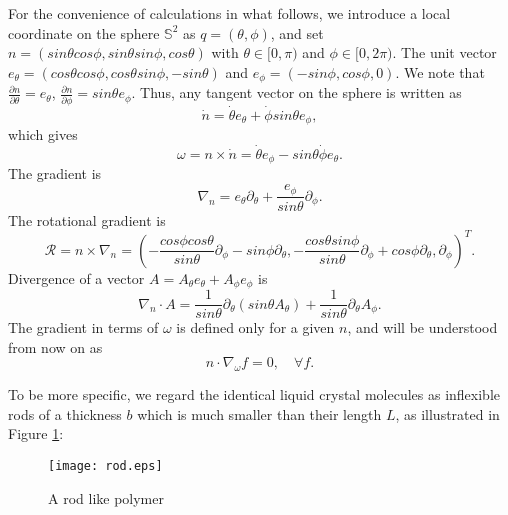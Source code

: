 \documentclass[reqno]{amsart}
\numberwithin{equation}{section}
\theoremstyle{definition}
\theoremstyle{remark}
\begin{document}
For the convenience of calculations in what follows, we introduce a
local coordinate on the sphere $\mathbb{S}^2$ as $q=(\theta, \phi)$,
and set $n=(sin \theta cos \phi, sin \theta sin \phi, cos \theta)$
with $\theta \in [0, \pi)$ and $\phi\in [0, 2\pi)$. The unit vector
$e_\theta=(cos \theta cos \phi, cos \theta sin \phi, -sin \theta)$
and $e_\phi=(-sin \phi, cos \phi, 0)$. We note that $\frac{\partial
n}{\partial \theta}=e_\theta$, $\frac{\partial n}{\partial \phi}=sin
\theta e_\phi$. Thus, any tangent vector on the sphere is written as
$$
\dot n =\dot \theta e_\theta +\dot \phi sin \theta e_\phi,
$$
which gives
$$
\omega=n\times \dot n= \dot \theta e_\phi - sin \theta \dot \phi
e_\theta.
$$
 The gradient is
$$
\nabla_n=e_\theta \partial_\theta +\frac{e_\phi}{sin
\theta}\partial_\phi.
$$
The rotational gradient is
\begin{equation}\label{go}
\mathcal{R}= n\times \nabla_n=\left(-\frac{cos \phi cos \theta}{sin
\theta} \partial_\phi -sin \phi \partial_\theta, -\frac{cos \theta
sin \phi}{sin \theta} \partial_\phi +cos\phi \partial_\theta,
\partial_\phi \right)^T.
\end{equation}
Divergence of a vector $A= A_\theta e_\theta +  A_\phi  e_\phi$ is
$$
\nabla_n\cdot A=\frac{1}{sin \theta} \partial_\theta(sin \theta
A_\theta) +\frac{1}{sin \theta}\partial_\theta A_\phi.
$$
The gradient in terms of $\omega$ is defined only for a given $n$,
and will be understood from now on as
$$
 n\cdot \nabla_\omega f=0, \quad \forall f.
$$

To be more specific, we regard the identical liquid crystal
molecules as inflexible rods of a thickness $b$ which is much
smaller than their length $L$, as illustrated in Figure \ref{fig2}:
\begin{figure}[pth]
\begin{center}
\texttt{[image: rod.eps]}
\caption{A rod like polymer}\label{fig2}
\end{center}
\end{figure}
\end{document}
